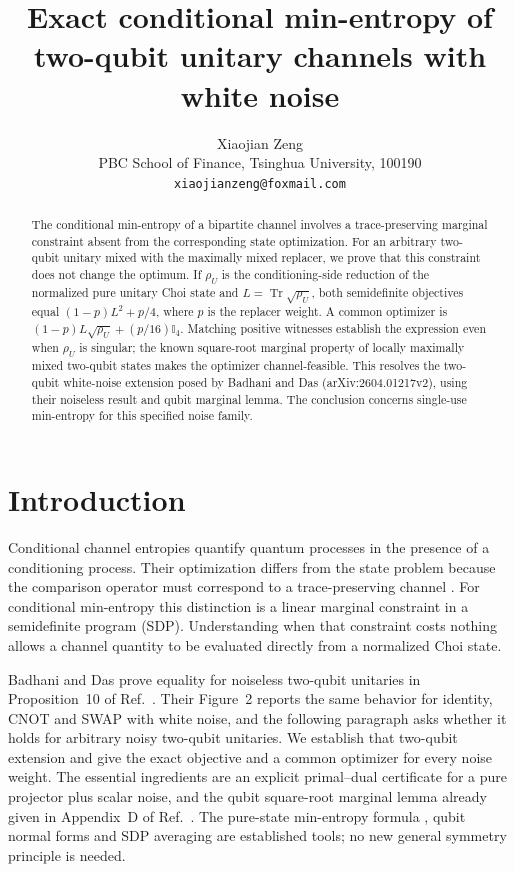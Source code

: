 \documentclass[11pt]{article}
\title{Exact conditional min-entropy of two-qubit unitary channels with white noise}
\author{Xiaojian Zeng\\
\small PBC School of Finance, Tsinghua University, 100190\\
\small \texttt{xiaojianzeng@foxmail.com}}
\date{}
\newcommand{\Tr}{\operatorname{Tr}}
\newcommand{\I}{\mathbb{I}}
\begin{document}
\maketitle
\begin{abstract}
The conditional min-entropy of a bipartite channel involves a
trace-preserving marginal constraint absent from the corresponding state
optimization. For an arbitrary two-qubit unitary mixed with the maximally
mixed replacer, we prove that this constraint does not change the optimum.
If $\rho_U$ is the conditioning-side reduction of the normalized pure
unitary Choi state and $L=\Tr\sqrt{\rho_U}$, both semidefinite objectives
equal $(1-p)L^2+p/4$, where $p$ is the replacer weight.
A common optimizer is $(1-p)L\sqrt{\rho_U}+(p/16)\I_4$.
Matching positive witnesses establish the expression even when $\rho_U$
is singular; the known square-root marginal property of locally maximally
mixed two-qubit states makes the optimizer channel-feasible.
This resolves the two-qubit white-noise extension posed by Badhani and Das
(arXiv:2604.01217v2), using their noiseless result and qubit marginal lemma.
The conclusion concerns single-use min-entropy for this specified noise
family.
\end{abstract}

\section{Introduction}
Conditional channel entropies quantify quantum processes in the presence
of a conditioning process. Their optimization differs from the state
problem because the comparison operator must correspond to a
trace-preserving channel \cite{Das2024,Badhani2026}.
For conditional min-entropy this distinction is a linear marginal
constraint in a semidefinite program (SDP).
Understanding when that constraint costs nothing allows a channel
quantity to be evaluated directly from a normalized Choi state.

Badhani and Das prove equality for noiseless two-qubit unitaries in
Proposition~10 of Ref.~\cite{Badhani2026}.
Their Figure~2 reports the same behavior for identity, CNOT and SWAP
with white noise, and the following paragraph asks whether it holds for
arbitrary noisy two-qubit unitaries.
We establish that two-qubit extension and give the exact objective and
a common optimizer for every noise weight.
The essential ingredients are an explicit primal--dual certificate for
a pure projector plus scalar noise, and the qubit square-root marginal
lemma already given in Appendix~D of Ref.~\cite{Badhani2026}.
The pure-state min-entropy formula \cite{KRS2009}, qubit normal forms and
SDP averaging are established tools; no new general symmetry principle is
needed.
\end{document}
